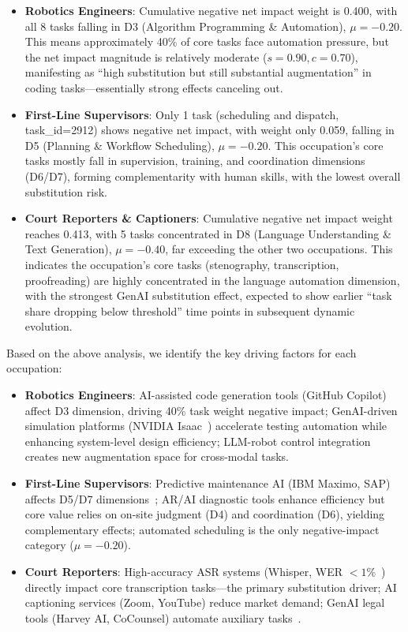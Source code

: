 \begin{itemize}
    \item \textbf{Robotics Engineers}: Cumulative negative net impact weight is 0.400, with all 8 tasks falling in D3 (Algorithm Programming \& Automation), $\mu=-0.20$. This means approximately 40\% of core tasks face automation pressure, but the net impact magnitude is relatively moderate ($s=0.90,c=0.70$), manifesting as ``high substitution but still substantial augmentation'' in coding tasks---essentially strong effects canceling out.
    \item \textbf{First-Line Supervisors}: Only 1 task (scheduling and dispatch, task\_id=2912) shows negative net impact, with weight only 0.059, falling in D5 (Planning \& Workflow Scheduling), $\mu=-0.20$. This occupation's core tasks mostly fall in supervision, training, and coordination dimensions (D6/D7), forming complementarity with human skills, with the lowest overall substitution risk.
    \item \textbf{Court Reporters \& Captioners}: Cumulative negative net impact weight reaches 0.413, with 5 tasks concentrated in D8 (Language Understanding \& Text Generation), $\mu=-0.40$, far exceeding the other two occupations. This indicates the occupation's core tasks (stenography, transcription, proofreading) are highly concentrated in the language automation dimension, with the strongest GenAI substitution effect, expected to show earlier ``task share dropping below threshold'' time points in subsequent dynamic evolution.
\end{itemize}

Based on the above analysis, we identify the key driving factors for each occupation:

\begin{itemize}[leftmargin=1.5em, itemsep=0.4em]
    \item \textbf{Robotics Engineers}: AI-assisted code generation tools (GitHub Copilot) affect D3 dimension, driving 40\% task weight negative impact; GenAI-driven simulation platforms (NVIDIA Isaac~\cite{nvidia_isaac_2024}) accelerate testing automation while enhancing system-level design efficiency; LLM-robot control integration creates new augmentation space for cross-modal tasks.
    \item \textbf{First-Line Supervisors}: Predictive maintenance AI (IBM Maximo, SAP) affects D5/D7 dimensions~\cite{mckinsey_maintenance_2023}; AR/AI diagnostic tools enhance efficiency but core value relies on on-site judgment (D4) and coordination (D6), yielding complementary effects; automated scheduling is the only negative-impact category ($\mu=-0.20$).
    \item \textbf{Court Reporters}: High-accuracy ASR systems (Whisper, WER $<1\%$~\cite{whisper2022}) directly impact core transcription tasks---the primary substitution driver; AI captioning services (Zoom, YouTube) reduce market demand; GenAI legal tools (Harvey AI, CoCounsel) automate auxiliary tasks~\cite{ncra_trends_2024}.
\end{itemize}


